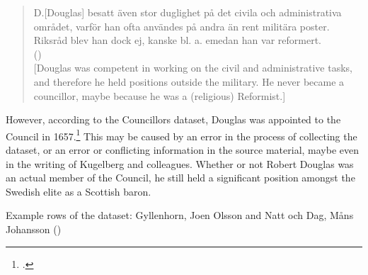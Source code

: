 \begin{quote}
	D.[Douglas] besatt även stor duglighet på det civila och administrativa området, varför han ofta användes på andra än rent militära poster. Riksråd blev han dock ej, kanske bl. a. emedan han var reformert.\\
	(\cite{sbl_robert_douglas})\\
	
	[Douglas was competent in working on the civil and administrative tasks, and therefore he held positions outside the military. He never became a councillor, maybe because he was a (religious) Reformist.]
\end{quote}

However, according to the Councillors dataset, Douglas was appointed to the Council in 1657.\footcite{councillorsDS} This may be caused by an error in the process of collecting the dataset, or an error or conflicting information in the source material, maybe even in the writing of Kugelberg and colleagues. Whether or not Robert Douglas was an actual member of the Council, he still held a significant position amongst the Swedish elite as a Scottish baron.

\begin{sidewaystable}
	\caption[Example rows of the dataset]{Example rows of the dataset: Gyllenhorn, Joen Olsson and Natt och Dag, Måns Johansson (\cite{councillorsDS})}
	\label{tab1}
\bigskip
	\caption{Example of the raw .csv file}
\end{sidewaystable}